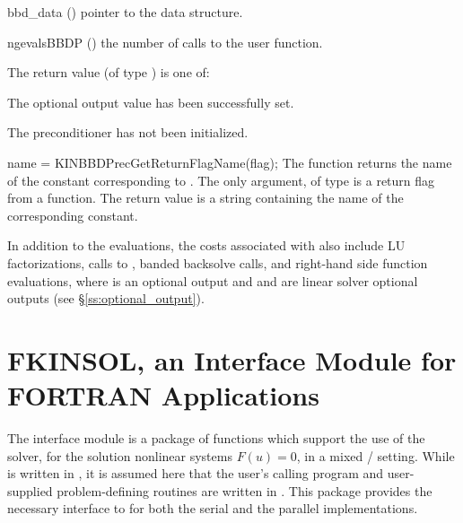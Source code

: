 {
  \begin{args}[ngevalsBBDP]
  \item[bbd\_data] ()
    pointer to the {\kinbbdpre} data structure.
  \item[ngevalsBBDP] ()
    the number of calls to the user  function.
  \end{args}
}
{
  The return value  (of type ) is one of:
  \begin{args}
  \item[\Id{KINBBDPRE\_SUCCESS}] 
    The optional output value has been successfully set.
  \item[\Id{KINBBDPRE\_PDATA\_NULL}]
    The {\kinbbdpre} preconditioner has not been initialized.
  \end{args}
}
{}
{
  name = KINBBDPrecGetReturnFlagName(flag);
}
{
  The function  returns the
  name of the {\kinbbdpre} constant corresponding to .
}
{
  The only argument, of type  is a return flag from a {\kinbbdpre} function.
}
{
  The return value is a string containing the name of the corresponding constant.
}
{}

In addition to the   evaluations,
the costs associated with {\kinbbdpre} also include  LU
factorizations,  calls to ,  banded
backsolve calls, and  right-hand side function evaluations,
where  is an optional {\kinsol} output and  and 
 are linear solver optional outputs (see \S\ref{ss:optional_output}).


\chapter{FKINSOL, an Interface Module for FORTRAN Applications}\label{s:fcmix}

The {\fkinsol} interface module is a package of {\C} functions which support
the use of the {\kinsol} solver, for the solution nonlinear systems
$F(u)=0$, in a mixed {\F}/{\C} setting.  While {\kinsol} is written
in {\C}, it is assumed here that the user's calling program and
user-supplied problem-defining routines are written in {\F}.
This package provides the necessary interface to {\kinsol} for both the
serial and the parallel {\nvector} implementations.

